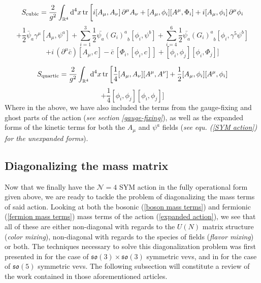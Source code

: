 %
%
\begin{equation*}
S_{\text{cubic}}
=
\frac{2}{g^2} \int_{\mathbb{R}^4} \text{d}^4 x
\tr \bigg[
i [A_\mu, A_\nu] \, \partial^\mu A_\nu
+
[A_\mu, \phi_i] [A^\mu, \Phi_i]
+
i [A_\mu, \phi_i] \, \partial^\mu \phi_i
\end{equation*}
%
%
\begin{equation*}
+
\frac{1}{2} \bar{\psi}_a \gamma^\mu [A_\mu, \psi^a]
+
\sum_{i=1}^3 \frac{1}{2} \bar{\psi_a} {(G_i)^a}_b [\phi_i, \psi^b]
+
\sum_{i=4}^6 \frac{1}{2} \bar{\psi_a} {(G_i)^a}_b [\phi_i, \gamma^5 \psi^b]
\end{equation*}
%
%
\begin{equation}
+
i \, ( \partial^\mu \bar{c} ) [A_\mu, c]
-
\bar{c} \, [\Phi_i, [\phi_i, c]]
+
[\phi_i, \phi_j][\phi_i, \Phi_j]
\bigg]
\end{equation}
%
%

%
%
\begin{equation*}
S_{\text{quartic}}
=
\frac{2}{g^2} \int_{\mathbb{R}^4} \text{d}^4 x
\tr \bigg[
\frac{1}{4} [A_\mu, A_\nu] [A^\mu, A^\nu]
+
\frac{1}{2} [A_\mu, \phi_i] [A^\mu, \phi_i]
\end{equation*}
%
%
\begin{equation}
+
\frac{1}{4} [\phi_i, \phi_j] [\phi_i, \phi_j]
\bigg]
\end{equation}
%
%
Where in the above, we have also included the terms from the gauge-fixing and ghost parts of the action (\textit{see section \ref{gauge-fixing}}), as well as the expanded forms of the kinetic terms for both the $A_\mu$ and $\psi^a$ fields (\textit{see equ. (\ref{SYM action}) for the unexpanded forms}). 

\subsection{Diagonalizing the mass matrix}\label{diag mass matrix}
Now that we finally have the $\mathcal{N} = 4$ SYM action in the fully operational form given above, we are ready to tackle the problem of diagonalizing the mass terms of said action. Looking at both the bosonic (\ref{boson mass terms}) and fermionic (\ref{fermion mass terms}) mass terms of the action (\ref{expanded action}), we see that all of these are either non-diagonal with regards to the $U(N)$ matrix structure (\textit{color mixing}), non-diagonal with regards to the species of fields (\textit{flavor mixing}) or both. The techniques necessary to solve this diagonalization problem was first presented in \cite{One-point functions in D3-D7} for the case of $\mathfrak{so}(3) \times \mathfrak{so}(3)$ symmetric vevs, and in \cite{One-point functions in D3-D7 SO(5)} for the case of $\mathfrak{so}(5)$ symmetric vevs. The following subsection will constitute a review of the work contained in those aforementioned articles.

